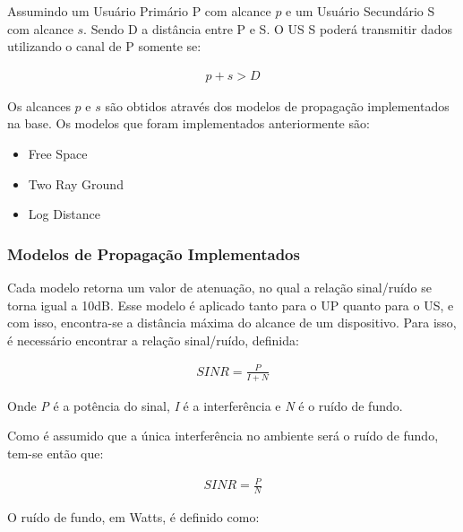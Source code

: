 Assumindo um Usuário Primário P com alcance \begin{math}p\end{math} e um Usuário Secundário S com alcance \begin{math}s\end{math}. Sendo D a distância entre P e S. O US S poderá transmitir dados utilizando o canal de P somente se:

\begin{align}
  \label{cantransmitdata} p + s > D
\end{align}

Os alcances \begin{math} p \end{math} e \begin{math} s \end{math} são obtidos através dos modelos de propagação implementados na base. Os modelos que foram implementados anteriormente são: 

\begin{itemize}
\item Free Space
\item Two Ray Ground
\item Log Distance
\end{itemize}

\subsubsection{Modelos de Propagação Implementados}

Cada modelo retorna um valor de atenuação, no qual a relação sinal/ruído se torna igual a 10dB. Esse modelo é aplicado tanto para o UP quanto para o US, e com isso, encontra-se a distância máxima do alcance de um dispositivo. Para isso, é necessário encontrar a relação sinal/ruído, definida:

\begin{align}
  \label{Sinr} SINR=\frac{P}{I+N}
\end{align}

Onde \textit{P} é a potência do sinal, \textit{I} é a interferência e \textit{N} é o ruído de fundo.

Como é assumido que a única interferência no ambiente será o ruído de fundo, tem-se então que:

\begin{align}
  \label{actSinr} SINR=\frac{P}{N}
\end{align}

O ruído de fundo, em Watts, é definido como:

